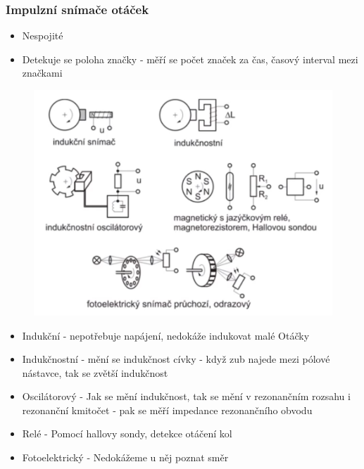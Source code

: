 \subsubsection*{Impulzní snímače otáček}
\begin{itemize}
    \item Nespojité
    \item Detekuje se poloha značky - měří se počet značek za čas, časový interval mezi značkami
\end{itemize}

\begin{figure}[h]
    \centering
    \includegraphics[scale = 0.50]{img/impulzRYCH.png}
\end{figure}

\begin{itemize}
    \item Indukční - nepotřebuje napájení, nedokáže indukovat malé Otáčky
    \item Indukčnostní - mění se indukčnost cívky - když zub najede mezi pólové nástavce, tak se zvětší indukčnost
    \item Oscilátorový - Jak se mění indukčnost, tak se mění v rezonančním rozsahu i rezonanční kmitočet - pak se měří impedance rezonančního obvodu
    \item Relé - Pomocí hallovy sondy, detekce otáčení kol
    \item Fotoelektrický - Nedokážeme u něj poznat směr 
\end{itemize}

